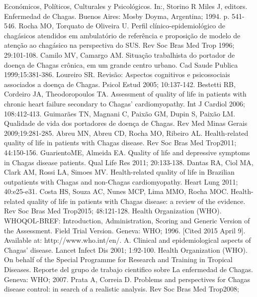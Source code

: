 \pagebreak\onecolumn
\begin{biblio}[References]
 Económicos, Políticos, Culturales y
 Psicológicos. In:, Storino R Miles J, editors. Enfermedad de Chagas. Buenos Aires:
 Mosby Doyma, Argentina; 1994. p. 541-546.
 Rocha MO, Torquato de Oliveira U. Perfil
 clínico-epidemiológico de chagásicos atendidos em ambulatório de referência e
 proposição de modelo de atenção ao chagásico na perspectiva do SUS. Rev Soc Bras Med
 Trop 1996; 29:101-108.
 Camilo MV, Camargo AM. Situação trabalhista do portador de
 doença de Chagas crônica, em um grande centro urbano. Cad Saude Publica
 1999;15:381-386.
 Loureiro SR. Revisão: Aspectos cognitivos e psicossociais
 associados a doença de Chagas. Psicol Estud 2005; 10:137-142.
 Bestetti RB, Cordeiro JA, Theodoropoulos TA. Assessment of
 quality of life in patients with chronic heart failure secondary to Chagas'
 cardiomyopathy. Int J Cardiol 2006; 108:412-413.
 Guimarães TN, Magnani C, Paixão GM, Dupin S, Paixão LM.
 Qualidade de vida dos portadores de doença de Chagas. Rev Med Minas Gerais
 2009;19:281-285.
 Abreu MN, Abreu CD, Rocha MO, Ribeiro AL. Health-related
 quality of life in patients with Chagas disease. Rev Soc Bras Med Trop2011;
 44:150-156.
 GuarientoME, Almeida EA. Quality of life and depressive
 symptoms in Chagas disease patients. Qual Life Res 2011; 20:133-138.
 Dantas RA, Ciol MA, Clark AM, Rossi LA, Simoes MV.
 Health-related quality of life in Brazilian outpatients with Chagas and non-Chagas
 cardiomyopathy. Heart Lung 2011; 40:e25-e31.
 Costa HS, Souza AC, Nunes MCP, Lima MMO, Rocha MOC.
 Health-related quality of life in patients with Chagas disease: a review of the
 evidence. Rev Soc Bras Med Trop2015; 48:121-128.
Health Organization (WHO). WHOQOL-BREF: Introduction,
 Administration, Scoring and Generic Version of the Assessment. Field Trial Version.
 Geneva: WHO; 1996. [Cited 2015 April 9]. Available at:
 http://www.who.int/en/.
A. Clinical and epidemiological aspects of Chagas' disease. Lancet
 Infect Dis 2001; 1:92-100.
Health Organization (WHO). On behalf of the Special Programme for
 Research and Training in Tropical Diseases. Reporte del grupo de trabajo cientifico
 sobre La enfermedad de Chagas. Geneva: WHO; 2007.
 Prata A, Correia D. Problems and perspectives for Chagas
 disease control: in search of a realistic analysis. Rev Soc Bras Med Trop2008;

\end{biblio}
